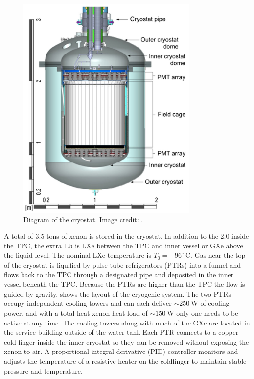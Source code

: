 \begin{figure}
\centering
\includegraphics[width=0.8\textwidth]{CryostatDiagram}
\caption{Diagram of the cryostat.  Image credit: .}
\label{fig:xenon1t_cryo_cryostat_diagram}
\end{figure}

A total of 3.5 tons of xenon is stored in the cryostat.  In addition to the 2.0 inside the TPC, the extra 1.5 is LXe between the
TPC and inner vessel or GXe above the liquid level.  The nominal LXe temperature is $T_{0} = -96^{\circ}\ \mathrm{C}$.  Gas near the top of
the cryostat is liquified by pulse-tube refrigerators (PTRs) into a funnel and flows back to the TPC through a designated pipe and
deposited in the inner vessel beneath the TPC.  Because
the PTRs are higher than the TPC the flow is guided by gravity.   shows the layout of the cryogenic
system.  The two PTRs occupy independent cooling towers and can each deliver ${\sim} 250\ \mathrm{W}$ of cooling power, and with
a total heat xenon heat load of ${\sim} 150\ \mathrm{W}$ only one needs to be active at any time.  The cooling towers along with much of the
GXe are located in the service building outside of the water tank  Each PTR connects to a copper cold finger
inside the inner cryostat so they can be removed without exposing the xenon to air.  A proportional-integral-derivative (PID) controller
monitors and adjusts the temperature of a resistive heater on the coldfinger to maintain stable pressure and temperature.

